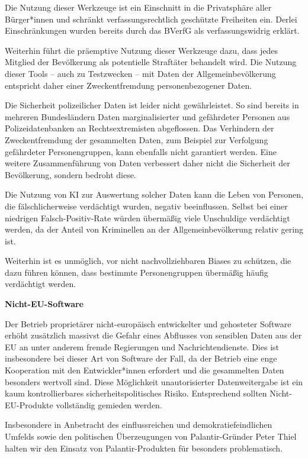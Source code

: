 \documentclass[DIV=calc]{scrartcl}
\begin{document}
Die Nutzung dieser Werkzeuge ist ein Einschnitt in die Privatsphäre aller Bürger*innen und schränkt verfassungsrechtlich geschützte Freiheiten ein.\cite{freiheitsrechteArtikel} Derlei Einschränkungen wurden bereits durch das BVerfG als verfassungswidrig erklärt.\cite{Bundesverfassungsgericht}

Weiterhin führt die präemptive Nutzung dieser Werkzeuge dazu, dass jedes Mitglied der Bevölkerung als potentielle Straftäter behandelt wird. Die Nutzung dieser Tools – auch zu Testzwecken – mit Daten der Allgemeinbevölkerung entspricht daher einer Zweckentfremdung personenbezogener Daten.\cite{netzpolitikArtikel}

Die Sicherheit polizeilicher Daten ist leider nicht gewährleistet. So sind bereits in mehreren Bundesländern Daten marginalisierter und gefährdeter Personen aus Polizeidatenbanken an Rechtsextremisten abgeflossen.\cite{datenabfragePolizei} \cite{netzpolitikAbfragePolizei} Das Verhindern der Zweckentfremdung der gesammelten Daten, zum Beispiel zur Verfolgung gefährdeter Personengruppen, kann ebenfalls nicht garantiert werden. Eine weitere Zusammenführung von Daten verbessert daher nicht die Sicherheit der Bevölkerung, sondern bedroht diese.

Die Nutzung von KI zur Auswertung solcher Daten kann die Leben von Personen, die fälschlicherweise verdächtigt wurden, negativ beeinflussen. Selbst bei einer niedrigen Falsch-Positiv-Rate würden übermäßig viele Unschuldige verdächtigt werden, da der Anteil von Kriminellen an der Allgemeinbevölkerung relativ gering ist.\cite{Statista}

Weiterhin ist es unmöglich, vor nicht nachvollziehbaren Biases zu schützen, die dazu führen können, dass
bestimmte Personengruppen übermäßig häufig verdächtigt werden.\cite{springer}

\textbf{Nicht-EU-Software}

Der Betrieb proprietärer nicht-europäisch entwickelter und gehosteter Software erhöht zusätzlich massivst die Gefahr eines Abflusses von sensiblen Daten aus der EU an unter anderem fremde Regierungen und Nachrichtendienste.\cite{Reuters} Dies ist insbesondere bei dieser Art von Software der Fall, da der Betrieb eine enge Kooperation mit den Entwickler*innen erfordert und die gesammelten Daten besonders wertvoll sind. Diese Möglichkeit unautorisierter Datenweitergabe ist ein kaum kontrollierbares sicherheitspolitisches Risiko. Entsprechend sollten Nicht-EU-Produkte vollständig gemieden werden.

Insbesondere in Anbetracht des einflussreichen und demokratiefeindlichen Umfelds sowie den politischen Überzeugungen von Palantir-Gründer Peter Thiel halten wir den Einsatz von Palantir-Produkten für besonders problematisch. \cite{PeterThiel}
\end{document}

